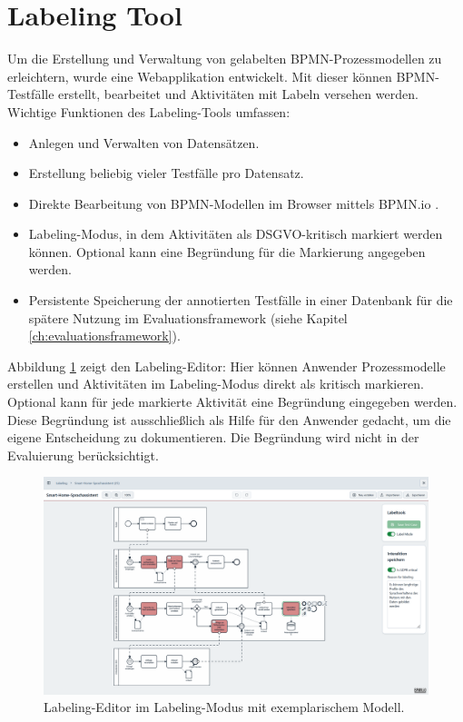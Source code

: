 \section{Labeling Tool}\label{sec:labeling-tool}

Um die Erstellung und Verwaltung von gelabelten \ac{BPMN}-Prozessmodellen zu erleichtern, wurde eine Webapplikation entwickelt. Mit dieser können \ac{BPMN}-Testfälle erstellt, bearbeitet und Aktivitäten mit Labeln versehen werden. Wichtige Funktionen des Labeling-Tools umfassen:

\begin{itemize}
    \item Anlegen und Verwalten von Datensätzen.
    \item Erstellung beliebig vieler Testfälle pro Datensatz.
    \item Direkte Bearbeitung von \ac{BPMN}-Modellen im Browser mittels BPMN.io \cite{bpmnio}.
    \item Labeling-Modus, in dem Aktivitäten als \ac{DSGVO}-kritisch markiert werden können. Optional kann eine Begründung für die Markierung angegeben werden.
    \item Persistente Speicherung der annotierten Testfälle in einer Datenbank für die spätere Nutzung im Evaluationsframework (siehe Kapitel \ref{ch:evaluationsframework}).
\end{itemize}

Abbildung \ref{fig:labeling-editor} zeigt den Labeling-Editor: Hier können Anwender Prozessmodelle erstellen und Aktivitäten im Labeling-Modus direkt als kritisch markieren. Optional kann für jede markierte Aktivität eine Begründung eingegeben werden. Diese Begründung ist ausschließlich als Hilfe für den Anwender gedacht, um die eigene Entscheidung zu dokumentieren. Die Begründung wird nicht in der Evaluierung berücksichtigt.

\begin{figure}
    \centering
    \includegraphics[width=\textwidth]{images/labeling/labeling-editor}
    \caption{Labeling-Editor im Labeling-Modus mit exemplarischem Modell.}
    \label{fig:labeling-editor}
\end{figure}

